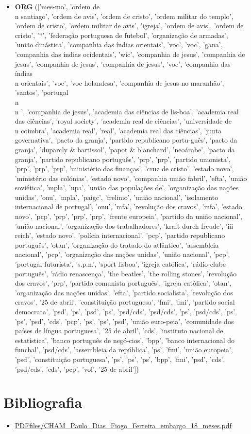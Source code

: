\documentclass{article}
\begin{document}
\begin{itemize}
\item \textbf{ORG} (['mes-mo', 'ordem de\\n santiago', 'ordem de avis', 'ordem de cristo', 'ordem militar do templo', 'ordem de cristo', 'ordem militar de avis', 'igreja', 'ordem de avis', 'ordem de cristo', '“', 'federação portuguesa de futebol', 'organização de armadas', 'união dinástica', 'companhia das índias orientais', 'voc', 'voc', 'gana', 'companhia das índias ocidentais', 'wic', 'companhia de jesus', 'companhia de jesus', 'companhia de jesus', 'companhia de jesus', 'voc', 'companhia das índias\\n orientais', 'voc', 'voc holandesa', 'companhia de jesus no maranhão', 'santos', 'portugal\\n\\n ', 'companhia de jesus', 'academia das ciências de lis-boa', 'academia real das ciências', 'royal society', 'academia real de ciências', 'universidade de\\n coimbra', 'academia real', 'real', 'academia real das ciências', 'junta governativa', 'pacto da granja', 'partido republicano portu-guês', 'pacto da granja', 'duparcly \& bartissol', 'papot \& blanchard', 'neoárabe', 'pacto da granja', 'partido republicano português', 'prp', 'prp', 'partido unionista', 'prp', 'prp', 'prp', 'ministério das finanças', 'cruz de cristo', 'estado novo', 'ministério das colónias', 'estado novo', 'companhia união fabril', 'efta', 'união soviética', 'mpla', 'upa', 'união das populações de', 'organização das nações unidas', 'onu', 'mpla', 'paigc', 'frelimo', 'união nacional', 'isolamento internacional de portugal', 'onu', 'mfa', 'revolução dos cravos', 'mfa', 'estado novo', 'pcp', 'prp', 'prp', 'prp', 'frente europeia', 'partido da união nacional', 'união nacional', 'organização dos trabalhadores', 'kraft durch freude', 'iii reich', 'estado novo', 'polícia internacional', 'pcp', 'partido republicano português', 'otan', 'organização do tratado do atlântico', 'assembleia nacional', 'pcp', 'organização das nações unidas', 'união nacional', 'pcp', 'portugal futurista', 's.p.n.', 'sport lisboa', 'igreja católica', 'rádio clube português', 'rádio renascença', 'the beatles', 'the rolling stones', 'revolução dos cravos', 'prp', 'partido comunista português', 'igreja católica', 'otan', 'organização das nações unidas', 'efta', 'partido socialista', 'revolução dos cravos', '25 de abril', 'constituição portuguesa', 'fmi', 'fmi', 'partido social democrata', 'psd', 'ps', 'psd', 'ps', 'psd/cds', 'psd/cds', 'ps', 'psd/cds', 'ps', 'ps', 'psd', 'cds', 'pcp', 'ps', 'ps', 'psd', 'união euro-peia', 'comunidade dos países de língua portuguesa', '25 de abril', 'cds', 'instituto nacional de estatística', 'banco português de negó-cios', 'bpp', 'banco internacional do funchal', 'psd/cds', 'assembleia da república', 'ps', 'fmi', 'união europeia', 'psd', 'constituição portuguesa', 'ps', 'ps', 'ps', 'bpp', 'fmi', 'psd', 'cds', 'psd/cds', 'cds', 'pcp', 'vol', '25 de abril'])
\end{itemize}

\section{Bibliografia}
\begin{itemize}
\item \url{PDFfiles/CHAM_Paulo_Dias_Fiogo_Ferreira_embargo_18_meses.pdf}
\end{itemize}
\end{document}
